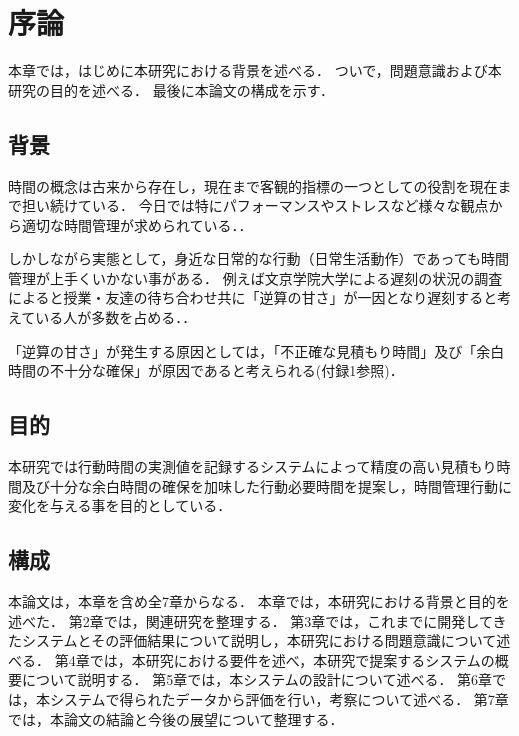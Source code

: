 \chapter{序論}
本章では，はじめに本研究における背景を述べる．
ついで，問題意識および本研究の目的を述べる．
最後に本論文の構成を示す．

\section{背景}
時間の概念は古来から存在し，現在まで客観的指標の一つとしての役割を現在まで担い続けている\cite{history}．
今日では特にパフォーマンスやストレスなど様々な観点から適切な時間管理が求められている．\cite{Barling1996}\cite{Britton1991}\cite{Burt1994}\cite{Macan1994}．

しかしながら実態として，身近な日常的な行動（日常生活動作）であっても時間管理が上手くいかない事がある．
例えば文京学院大学による遅刻の状況の調査によると授業・友達の待ち合わせ共に「逆算の甘さ」が一因となり遅刻すると考えている人が多数を占める．\cite{bunkyo}．

「逆算の甘さ」が発生する原因としては，「不正確な見積もり時間」及び「余白時間の不十分な確保」が原因であると考えられる(付録1参照)．


\section{目的}
本研究では行動時間の実測値を記録するシステムによって精度の高い見積もり時間及び十分な余白時間の確保を加味した行動必要時間を提案し，時間管理行動に変化を与える事を目的としている．

\section{構成}
本論文は，本章を含め全7章からなる．
本章では，本研究における背景と目的を述べた．
第2章では，関連研究を整理する．
第3章では，これまでに開発してきたシステムとその評価結果について説明し，本研究における問題意識について述べる．
第4章では，本研究における要件を述べ，本研究で提案するシステムの概要について説明する．
第5章では，本システムの設計について述べる．
第6章では，本システムで得られたデータから評価を行い，考察について述べる．
第7章では，本論文の結論と今後の展望について整理する．